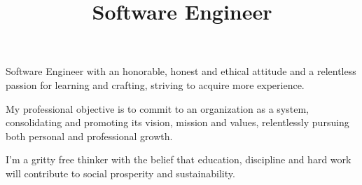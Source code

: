 \documentclass[10pt,a4paper,sans]{moderncv}        %
\title{Software Engineer}                               %
\begin{document}
\makecvtitle

Software Engineer with an honorable, honest and ethical attitude and a relentless passion for learning and crafting, striving to acquire more experience.

My professional objective is to commit to an organization as a system, consolidating and promoting its vision, mission and values, relentlessly pursuing both personal and professional growth.%

I'm a gritty free thinker with the belief that education, discipline and hard work will contribute to social prosperity and sustainability.
\end{document}
